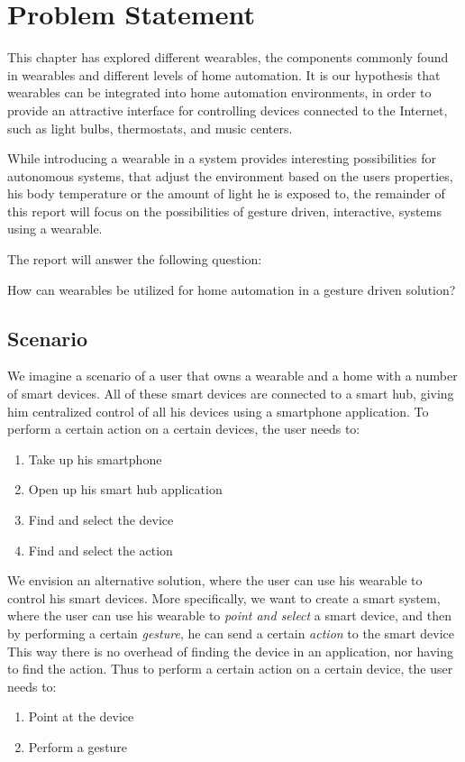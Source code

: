 \section{Problem Statement}\label{sec:researchstatement}
This chapter has explored different wearables, 
the components commonly found in wearables and different levels of home automation. 
It is our hypothesis that wearables can be integrated into home automation environments, 
in order to provide an attractive interface for controlling devices connected to the Internet, 
such as light bulbs, thermostats, and music centers.

While introducing a wearable in a system provides interesting possibilities for autonomous systems, 
that adjust the environment based on the users properties, 
\eg his body temperature or the amount of light he is exposed to,
the remainder of this report will focus on the possibilities of gesture driven, \ie interactive, systems using a wearable.

The report will answer the following question:

\begin{framed}
      How can wearables be utilized for home automation in a gesture driven solution?
\end{framed}

\subsection{Scenario}\label{sec:scenario}
We imagine a scenario of a user that owns a wearable and a home with a number of smart devices. 
All of these smart devices are connected to a smart hub, 
giving him centralized control of all his devices using \eg a smartphone application.
To perform a certain action on a certain devices, the user needs to:
\begin{enumerate}
  \item Take up his smartphone
  \item Open up his smart hub application
  \item Find and select the device
  \item Find and select the action
\end{enumerate}

We envision an alternative solution, 
where the user can use his wearable to control his smart devices. 
More specifically, we want to create a smart system, 
where the user can use his wearable to \emph{point and select} a smart device, 
and then by performing a certain \emph{gesture}, he can send a certain \emph{action} to the smart device
This way there is no overhead of finding the device in an application, 
nor having to find the action. 
Thus to perform a certain action on a certain device, the user needs to:
\begin{enumerate}
  \item Point at the device
  \item Perform a gesture
\end{enumerate}

